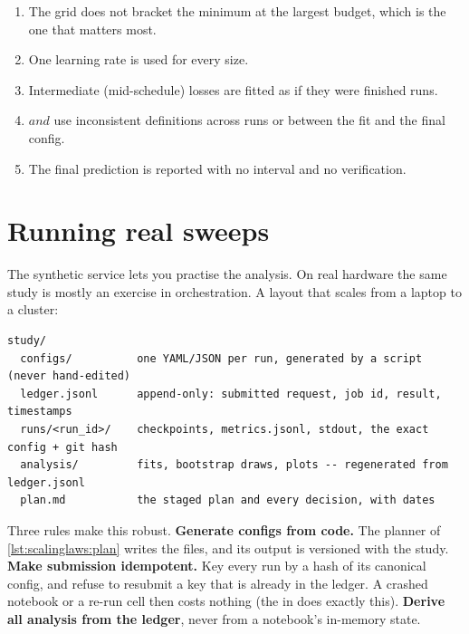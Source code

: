 \begin{pitfall}
\begin{enumerate}
\item The grid does not bracket the minimum at the largest budget, which is the one that matters most.
\item One learning rate is used for every size.
\item Intermediate (mid-schedule) losses are fitted as if they were finished runs.
\item $ and $ use inconsistent definitions across runs or between the fit and the final config.
\item The final prediction is reported with no interval and no verification.
\end{enumerate}
\end{pitfall}

\section{Running real sweeps}\label{sec:scalinglaws:running}

The synthetic service lets you practise the analysis. On real hardware the same study is mostly
an exercise in orchestration. A layout that scales from a laptop to a cluster:

\begin{lstlisting}[style=plain]
study/
  configs/          one YAML/JSON per run, generated by a script (never hand-edited)
  ledger.jsonl      append-only: submitted request, job id, result, timestamps
  runs/<run_id>/    checkpoints, metrics.jsonl, stdout, the exact config + git hash
  analysis/         fits, bootstrap draws, plots -- regenerated from ledger.jsonl
  plan.md           the staged plan and every decision, with dates
\end{lstlisting}

Three rules make this robust. \textbf{Generate configs from code.} The planner of
\cref{lst:scalinglaws:plan} writes the files, and its output is versioned with the study.
\textbf{Make submission idempotent.} Key every run by a hash of its canonical config, and refuse to
resubmit a key that is already in the ledger. A crashed notebook or a re-run cell then costs
nothing (the  in  does exactly this).
\textbf{Derive all analysis from the ledger}, never from a notebook's in-memory state.

